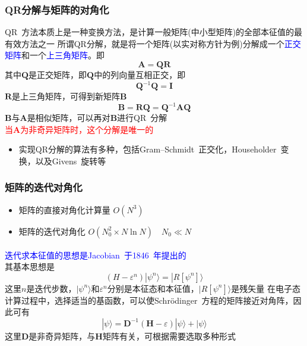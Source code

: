 \documentclass[cjk,slidestop,compress,mathserif,blue]{beamer}
\newcommand{\upcite}[1]{\hspace{0ex}\textsuperscript{\cite{#1}}} %
\begin{document}
\frame
{
	\frametitle{\textrm{QR}分解与矩阵的对角化}
	\textrm{QR~}方法本质上是一种变换方法，是计算一般矩阵(中小型矩阵)的全部本征值的最有效方法之一
\vskip 5pt
	所谓\textrm{QR}分解，就是将一个矩阵(以实对称方针为例)分解成一个\textcolor{blue}{正交矩阵}和一个\textcolor{blue}{上三角矩阵}。即
	\begin{displaymath}
		\mathbf{A}=\mathbf{Q}\mathbf{R}
	\end{displaymath}
	其中$\mathbf{Q}$是正交矩阵，即$\mathbf{Q}$中的列向量互相正交，即
	\begin{displaymath}
		\mathbf{Q}^{-1}\mathbf{Q}=\mathbf{I} 
	\end{displaymath}
	$\mathbf{R}$是上三角矩阵，可得到新矩阵$\mathbf{B}$
	\begin{displaymath}
		\mathbf{B}=\mathbf{R}\mathbf{Q}=\mathbf{Q}^{-1}\mathbf{A}\mathbf{Q}
	\end{displaymath}
	$\mathbf{B}$与$\mathbf{A}$是相似矩阵，可以再对$\mathbf{B}$进行\textrm{QR~}分解\\
	\textcolor{red}{当$\mathbf{A}$为非奇异矩阵时，这个分解是唯一的}
	\begin{itemize}
		\item 实现\textrm{QR}分解的算法有多种，包括\textrm{Gram–Schmidt~}正交化，\textrm{Householder~}变换，以及\textrm{Givens~}旋转等
	\end{itemize}
}

\frame
{
	\frametitle{矩阵的迭代对角化}
	\begin{itemize}
		\item 矩阵的直接对角化计算量 $O(N^3)$
		\item 矩阵的迭代对角化 $O(N_0^2\times N\ln N)\quad N_0\ll N$
	\end{itemize}
	\textcolor{blue}{迭代求本征值的思想是\textrm{Jacobian~}于\textrm{1846~}年提出的}\upcite{Crelle30-51_1846}\\
	其基本思想是
	\begin{displaymath}
		(H-\varepsilon^n)|\psi^n\rangle=|R[\psi^n]\rangle
	\end{displaymath}
	这里$n$是迭代步数，$|\psi^n\rangle$和$\varepsilon^n$分别是本征态和本征值，$|R[\psi^n]\rangle$是残矢量
	\vskip 10pt
	在电子态计算过程中，选择适当的基函数，可以使\textrm{Schr\"odinger~}方程的矩阵接近对角阵，因此可有
	\begin{displaymath}
		|\psi\rangle=\mathbf{D}^{-1}(\mathbf{H}-\varepsilon)|\psi\rangle+|\psi\rangle
	\end{displaymath}
	这里$\mathbf{D}$是非奇异矩阵，与$\mathbf{H}$矩阵有关，可根据需要选取多种形式
}
\end{document}
